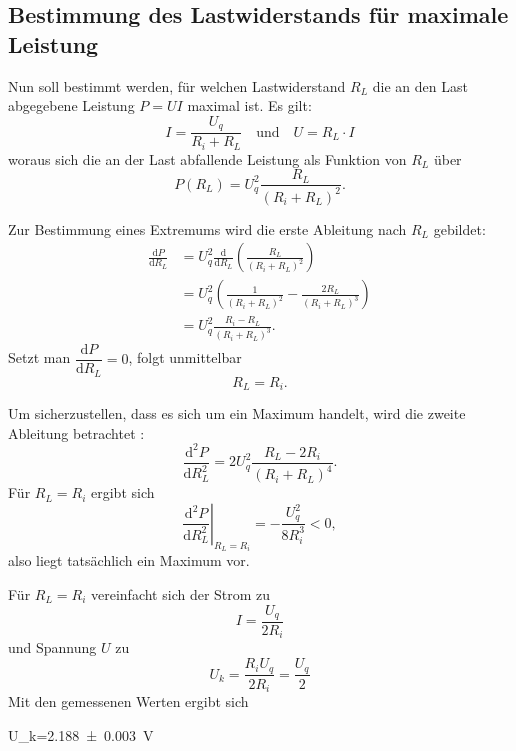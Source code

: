 \subsection{Bestimmung des Lastwiderstands für maximale Leistung}
Nun soll bestimmt werden, für welchen Lastwiderstand \(R_L\) die an den Last abgegebene
Leistung \(P=U I\) maximal ist. Es gilt:
\begin{equation}
    I=\frac{U_q}{R_i+R_L}\quad\text{und}\quad U=R_L\cdot I
\end{equation}
woraus sich die an der Last abfallende Leistung als Funktion von \(R_L\) über 
\begin{equation}
    P(R_L)=U_q^2\frac{R_L}{(R_i+R_L)^2}.
\end{equation}

Zur Bestimmung eines Extremums wird die erste Ableitung nach \(R_L\) gebildet:
\begin{align*}
    \frac{\mathrm{d}P}{\mathrm{d}R_L}
    &=U_q^2\frac{\mathrm{d}}{\mathrm{d}R_L}\left(\frac{R_L}{(R_i+R_L)^2}\right)\\
    &=U_q^2\left(\frac{1}{(R_i+R_L)^2}-\frac{2R_L}{(R_i+R_L)^3}\right)\\
    &=U_q^2\frac{R_i-R_L}{(R_i+R_L)^3}.
\end{align*}
Setzt man \(\dfrac{\mathrm{d}P}{\mathrm{d}R_L}=0\), folgt unmittelbar
\begin{equation}
    R_L=R_i.
\end{equation}

Um sicherzustellen, dass es sich um ein Maximum handelt, wird die zweite Ableitung betrachtet   :
\begin{equation}
    \frac{\mathrm{d}^2P}{\mathrm{d}R_L^2}
    =2U_q^2\frac{R_L-2R_i}{(R_i+R_L)^4}.
\end{equation}
Für \(R_L=R_i\) ergibt sich
\begin{equation}
    \left.\frac{\mathrm{d}^2P}{\mathrm{d}R_L^2}\right|_{R_L=R_i}
    =-\frac{U_q^2}{8R_i^3}<0,
\end{equation}
also liegt tatsächlich ein Maximum vor.

Für \(R_L=R_i\) vereinfacht sich der Strom zu
\begin{equation}
    I=\frac{U_q}{2R_i}
\end{equation}
und Spannung \(U\) zu
\begin{equation}
    U_k=\frac{R_i U_q }{2R_i}=\frac{U_q}{2}
\end{equation}
Mit den gemessenen Werten ergibt sich
\begin{rb}
    U_k=\qty{2.188(3)}{\volt}
\end{rb}


